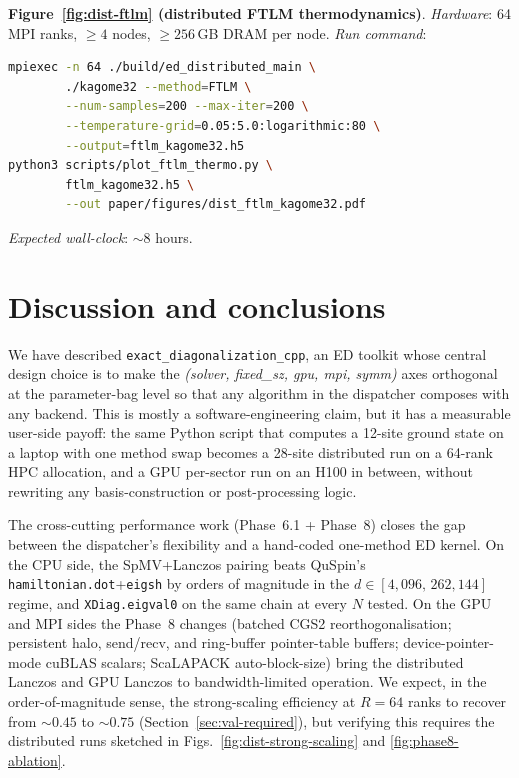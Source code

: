\documentclass[submission, PhysCodeb]{SciPost}
\begin{document}
\begin{requiredrun}[label={req:dist-ftlm}]
\textbf{Figure~\ref{fig:dist-ftlm} (distributed FTLM thermodynamics)}.
\smallskip\noindent
\textit{Hardware}: 64 MPI ranks, $\geq 4$ nodes, $\geq 256$\,GB DRAM
per node.
\smallskip\noindent
\textit{Run command}:
\begin{lstlisting}[language=bash]
mpiexec -n 64 ./build/ed_distributed_main \
        ./kagome32 --method=FTLM \
        --num-samples=200 --max-iter=200 \
        --temperature-grid=0.05:5.0:logarithmic:80 \
        --output=ftlm_kagome32.h5
python3 scripts/plot_ftlm_thermo.py \
        ftlm_kagome32.h5 \
        --out paper/figures/dist_ftlm_kagome32.pdf
\end{lstlisting}
\textit{Expected wall-clock}: $\sim$8 hours.
\end{requiredrun}

\section{Discussion and conclusions}
\label{sec:conclusions}

We have described \texttt{exact\_diagonalization\_cpp}, an ED toolkit
whose central design choice is to make the
\emph{(solver, fixed\_sz, gpu, mpi, symm)} axes orthogonal at the
parameter-bag level so that any algorithm in the dispatcher composes
with any backend. This is mostly a software-engineering claim, but it
has a measurable user-side payoff: the same Python script that
computes a 12-site ground state on a laptop with one method swap
becomes a 28-site distributed run on a 64-rank HPC allocation, and a
GPU per-sector run on an H100 in between, without rewriting any
basis-construction or post-processing logic.

The cross-cutting performance work (Phase~6.1 + Phase~8) closes the
gap between the dispatcher's flexibility and a hand-coded one-method
ED kernel. On the CPU side, the SpMV+Lanczos pairing beats QuSpin's
\texttt{hamiltonian.dot}+\texttt{eigsh} by orders of magnitude in the
$d \in [4{,}096,\,262{,}144]$ regime, and \texttt{XDiag.eigval0} on
the same chain at every $N$ tested. On the GPU and MPI sides the
Phase~8 changes (batched CGS2 reorthogonalisation; persistent halo,
send/recv, and ring-buffer pointer-table buffers; device-pointer-mode
cuBLAS scalars; ScaLAPACK auto-block-size) bring the distributed
Lanczos and GPU Lanczos to bandwidth-limited operation. We expect, in
the order-of-magnitude sense, the strong-scaling efficiency at
$R=64$ ranks to recover from $\sim 0.45$ to $\sim 0.75$
(Section~\ref{sec:val-required}), but verifying this requires the
distributed runs sketched in Figs.~\ref{fig:dist-strong-scaling} and
\ref{fig:phase8-ablation}.
\end{document}
